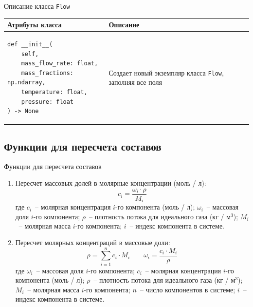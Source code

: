 \documentclass[aspectratio=169, mathserif]{beamer}%
\begin{document}
\begin{frame}[fragile, label=c]{Описание класса \texttt{Flow}}
\scriptsize
\begin{table}[h!]
	\centering
	\renewcommand{\arraystretch}{1.2}
	\begin{tabular}{|p{.49\linewidth}|p{.49\linewidth}|}
		\hline
		\textbf{Атрибуты класса} & \textbf{Описание}  \\
		\hline
\begin{minipage}{\linewidth}
\begin{verbatim}
def __init__(
    self,
    mass_flow_rate: float,
    mass_fractions: np.ndarray,
    temperature: float,
    pressure: float
) -> None
\end{verbatim}
\end{minipage}
		&
\begin{minipage}{\linewidth}
Создает новый экземпляр класса \texttt{Flow}, заполняя все поля
\end{minipage}
 \\
		\hline
	\end{tabular}
\end{table}
\vfill
\end{frame}

\subsection{Функции для пересчета составов}
\begin{frame}[fragile, label=c]{Функции для пересчета составов}
\scriptsize
\begin{enumerate}
\item Пересчет массовых долей в молярные концентрации (моль / л):
\vfill
\begin{equation*}
	c _i = \dfrac{\omega _i \cdot \rho}{M_i}
\end{equation*}
\vfill
где $c _i$~-- молярная концентрация $i$-го компонента (моль / л); $\omega _i$~-- массовая доля $i$-го компонента; $\rho $~-- плотность потока для идеального газа (кг / м$^3$); $M _i$~-- молярная масса $i$-го компонента; $i$~-- индекс компонента в системе.
\vfill
\item Пересчет молярных концентраций в массовые доли:
\vfill
$$
	\rho = \sum \limits _{i=1} ^{n} c_i \cdot M_i \qquad \omega _i = \dfrac{c_i \cdot M_i}{\rho}
$$
\vfill
где $\omega _i$~-- массовая доля $i$-го компонента; $c _i$~-- молярная концентрация $i$-го компонента (моль / л); $\rho $~-- плотность потока для идеального газа (кг / м$^3$); $M_i$~-- молярная масса $i$-го компонента; $n$~-- число компонентов в системе; $i$~-- индекс компонента в системе.
\vfill
\end{enumerate}
\vfill
\end{frame}
\end{document}
